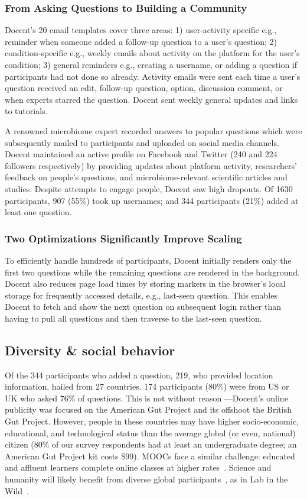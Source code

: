 \subsubsection{From Asking Questions to Building a Community}
Docent’s 20 email templates cover three areas: 1) user-activity specific e.g., reminder when someone added a follow-up question to a user’s question; 2) condition-specific e.g., weekly emails about activity on the platform for the user’s condition; 3) general reminders e.g., creating a username, or adding a question if participants had not done so already. Activity emails were sent each time a user’s question received an edit, follow-up question, option, discussion comment, or when experts starred the question. Docent sent weekly general updates and links to tutorials.
 
A renowned microbiome expert recorded answers to popular questions which were subsequently mailed to participants and uploaded on social media channels. Docent maintained an active profile on Facebook and Twitter (240 and 224 followers respectively) by providing updates about platform activity, researchers’ feedback on people’s questions, and microbiome-relevant scientific articles and studies. Despite attempts to engage people, Docent saw high dropouts. Of 1630 participants, 907 (55\%) took up usernames; and 344 participants (21\%) added at least one question.

\subsubsection{Two Optimizations Significantly Improve Scaling}
To efficiently handle hundreds of participants, Docent initially renders only the first two questions while the remaining questions are rendered in the background. Docent also reduces page load times by storing markers in the browser’s local storage for frequently accessed details, e.g., last-seen question. This enables Docent to fetch and show the next question on subsequent login rather than having to pull all questions and then traverse to the last-seen question. 

\subsection{Diversity \& social behavior}
Of the 344 participants who added a question, 219, who provided location information, hailed from 27 countries. 174 participants (80\%) were from US or UK who asked 76\% of questions. This is not without reason —Docent’s online publicity was focused on the American Gut Project and its offshoot the British Gut Project. However, people in these countries may have higher socio-economic, educational, and technological status than the average global (or even, national) citizen (80\% of our survey respondents had at least an undergraduate degree; an American Gut Project kit costs \$99). MOOCs face a similar challenge: educated and affluent learners complete online classes at higher rates~\cite{Kizilcec2017b}. Science and humanity will likely benefit from diverse global participants~\cite{Henrich2010a}, as in Lab in the Wild~\cite{Reinecke2015}.

